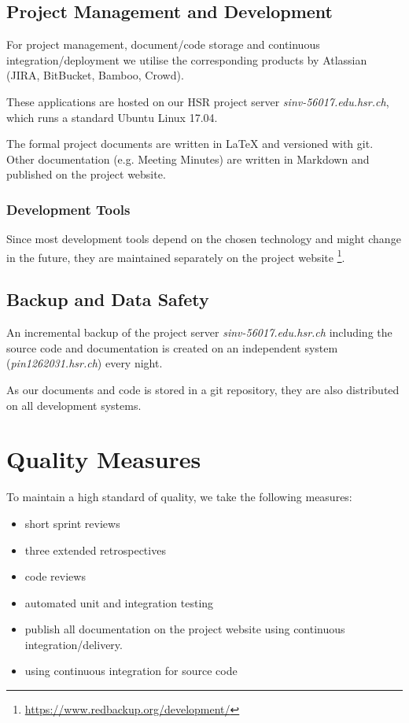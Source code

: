 \documentclass[a4paper]{article}
\begin{document}
\subsection{Project Management and Development}

For project management, document/code storage and continuous integration/deployment we utilise the corresponding products by Atlassian (JIRA, BitBucket, Bamboo, Crowd)\cite{atlassian-opensource}.

These applications are hosted on our HSR project server \textit{sinv-56017.edu.hsr.ch}, which runs a standard Ubuntu Linux 17.04.

The formal project documents are written in LaTeX and versioned with git. Other documentation (e.g. Meeting Minutes) are written in Markdown and published on the project website.

\subsubsection{Development Tools}

Since most development tools depend on the chosen technology and might change in the future, they are maintained separately on the project website \footnote{\url{https://www.redbackup.org/development/}}.

\subsection{Backup and Data Safety}

An incremental backup of the project server \textit{sinv-56017.edu.hsr.ch} including the source code and documentation is created on an independent system (\textit{pin1262031.hsr.ch}) every night.

As our documents and code is stored in a git repository, they are also distributed on all development systems.



\section{Quality Measures}
To maintain a high standard of quality, we take the following measures:

\begin{multicols}{2}
	\begin{itemize}
	    \item short sprint reviews
	    \item three extended retrospectives
	    \item code reviews
	    \item automated unit and integration testing
	    \item publish all documentation on the project website using continuous integration/delivery.
	    \item using continuous integration for source code
	\end{itemize}
\end{multicols}
\end{document}
